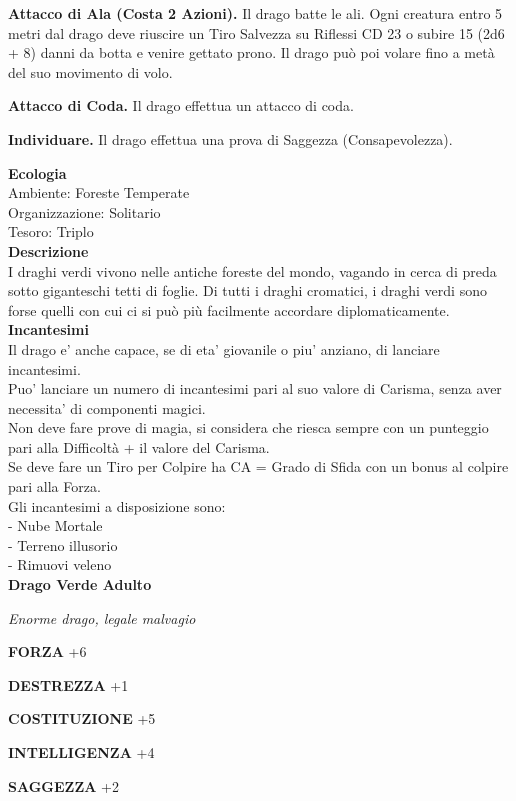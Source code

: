 \begin{multicols}{2}
\textbf{Attacco di Ala (Costa 2 Azioni).} Il drago batte le ali. Ogni creatura entro 5 metri dal drago deve riuscire un Tiro Salvezza su Riflessi CD 23 o subire 15 (2d6 + 8) danni da botta e venire gettato prono. Il drago può poi volare fino a metà del suo movimento di volo.

\textbf{Attacco di Coda.} Il drago effettua un attacco di coda.

\textbf{Individuare.} Il drago effettua una prova di Saggezza (Consapevolezza).

\textbf{Ecologia}\\
Ambiente: Foreste Temperate\\
Organizzazione: Solitario\\
Tesoro: Triplo\\
\textbf{Descrizione}\\
I draghi verdi vivono nelle antiche foreste del mondo, vagando in cerca di preda sotto giganteschi tetti di foglie. Di tutti i draghi cromatici, i draghi verdi sono forse quelli con cui ci si può più facilmente accordare diplomaticamente.\\
\textbf{Incantesimi}\\
Il drago e' anche capace, se di eta' giovanile o piu' anziano, di lanciare incantesimi.\\
Puo' lanciare un numero di incantesimi pari al suo valore di Carisma, senza aver necessita' di componenti magici.\\
Non deve fare prove di magia, si considera che riesca sempre con un punteggio pari alla Difficoltà + il valore del Carisma.\\
Se deve fare un Tiro per Colpire ha CA = Grado di Sfida con un bonus al colpire pari alla Forza.\\
Gli incantesimi a disposizione sono:\\
- Nube Mortale\\
- Terreno illusorio\\
- Rimuovi veleno\\


\medskip{}\textbf{Drago Verde Adulto}

\emph{Enorme drago, legale malvagio}

\textbf{FORZA} +6

\textbf{DESTREZZA} +1

\textbf{COSTITUZIONE} +5

\textbf{INTELLIGENZA} +4

\textbf{SAGGEZZA} +2


\end{multicols}
